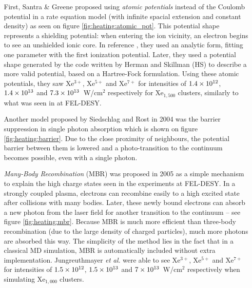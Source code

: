 First, Santra \& Greene proposed using \textit{atomic potentials} instead of
the Coulomb potential in a rate equation model (with infinite spacial
extension and
constant density) as seen on figure \ref{fig:heating:atomic_pot}.
This potential shape represents a shielding potential: when
entering the ion vicinity, an electron begins to see an unshielded ionic core.
In reference \cite{Greene2003}, they used an analytic form, fitting one
parameter
with the first ionization potential. Later\cite{Walters2006}, they used a
potential shape generated by the code written by Herman and
Skillman\cite{HS1963} (HS) to describe a more valid potential, based on a
Hartree-Fock formulation. Using these atomic potentials, they saw Xe$^{3+}$,
Xe$^{5+}$ and Xe$^{7+}$ for intensities of $\ten{1.4}{12}$, $\ten{1.4}{13}$ and
$\ten{7.3}{13}$~W/cm$^2$ respectively for Xe$_{1,500}$ clusters, similarly to
what was seen in at FEL-DESY.



Another model proposed by Siedschlag and Rost\cite{Siedschlag2004} in 2004 was
the barrier suppression in single photon absorption which is shown on figure
\ref{fig:heating:barrier}. Due to the close proximity
of neighbours, the potential barrier between them is lowered and
a photo-transition to the continuum becomes possible, even with a single photon.



\textit{Many-Body Recombination} (MBR) was proposed in 2005\cite{Jungreuthmayer2005}
as a simple mechanism to explain the high charge states seen in the
experiments at FEL-DESY. In a strongly coupled plasma, electrons can recombine
easily to a high excited
state after collisions with many bodies. Later, these newly bound electrons can
absorb a new photon from the laser field for another transition to the
continuum -- see figure \ref{fig:heating:mbr}.
Because MBR is much more efficient than three-body
recombination (due to the large density of charged particles), much more
photons are absorbed this way. The simplicity of the
method lies in the fact that in a classical MD simulation, MBR is automatically
included without extra implementation. Jungreuthmayer \textit{et al.} were able
to see Xe$^{3+}$, Xe$^{5+}$ and Xe$^{7+}$ for intensities of $\ten{1.5}{12}$,
$\ten{1.5}{13}$ and $\ten{7}{13}$~W/cm$^2$ respectively when simulating
Xe$_{1,000}$ clusters.


